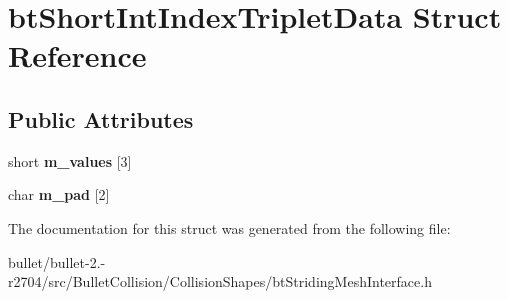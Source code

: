 \hypertarget{structbt_short_int_index_triplet_data}{\section{bt\+Short\+Int\+Index\+Triplet\+Data Struct Reference}
\label{structbt_short_int_index_triplet_data}
}
\subsection*{Public Attributes}
\begin{DoxyCompactItemize}
\item 
\hypertarget{structbt_short_int_index_triplet_data_a50f441b58b97b8d2e8e6c0878e92ae44}{short {\bfseries m\+\_\+values} \mbox{[}3\mbox{]}}\label{structbt_short_int_index_triplet_data_a50f441b58b97b8d2e8e6c0878e92ae44}

\item 
\hypertarget{structbt_short_int_index_triplet_data_a49fff40a282d74f691441f14afbe2dc4}{char {\bfseries m\+\_\+pad} \mbox{[}2\mbox{]}}\label{structbt_short_int_index_triplet_data_a49fff40a282d74f691441f14afbe2dc4}

\end{DoxyCompactItemize}


The documentation for this struct was generated from the following file\+:\begin{DoxyCompactItemize}
\item 
bullet/bullet-\/2.-\/r2704/src/\+Bullet\+Collision/\+Collision\+Shapes/bt\+Striding\+Mesh\+Interface.\+h\end{DoxyCompactItemize}
